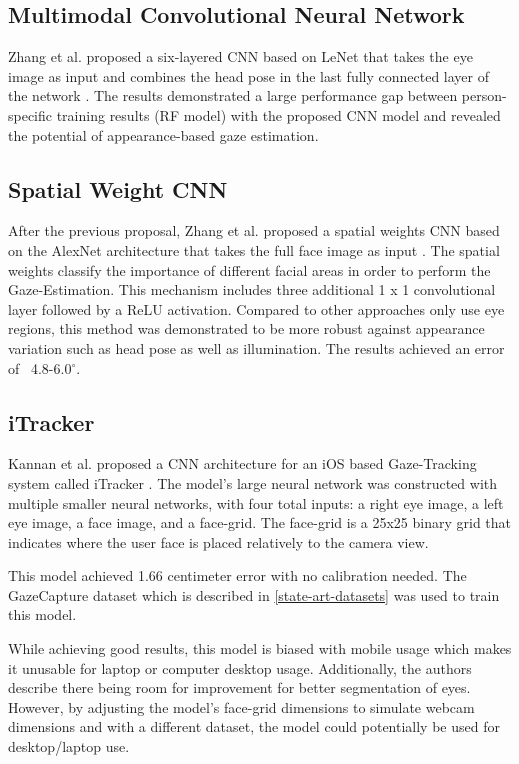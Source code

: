 \subsection{Multimodal Convolutional Neural Network}
Zhang et al. proposed a six-layered CNN based on LeNet that takes the eye image as input and combines the head pose in the last fully connected layer of the network \cite{GazeEstimationInTheWild}. The results demonstrated a large performance gap between person-specific training results (RF model) with the proposed CNN model and revealed the potential of appearance-based gaze estimation.

\subsection{Spatial Weight CNN}
After the previous proposal, Zhang et al. proposed a spatial weights CNN based on the AlexNet architecture \cite{alex_net} that takes the full face image as input \cite{written_all_over_your_face}. The spatial weights classify the importance of different facial areas in order to perform the Gaze-Estimation. This mechanism includes three additional 1 x 1 convolutional layer followed by a ReLU activation. Compared to other approaches only use eye regions, this method was demonstrated to be more robust against appearance variation such as head pose as well as illumination. The results achieved an error of ~4.8-6.0$^{\circ}$.

\subsection{iTracker}
Kannan et al. proposed a CNN architecture for an iOS based Gaze-Tracking system called iTracker \cite{iTracker}. The model's large neural network was constructed with multiple smaller neural networks, with four total inputs: a right eye image, a left eye image, a face image, and a face-grid. The face-grid is a 25x25 binary grid that indicates where the user face is placed relatively to the camera view. 

This model achieved 1.66 centimeter error with no calibration needed. The GazeCapture dataset which is described in \autoref{state-art-datasets} was used to train this model.

While achieving good results, this model is biased with mobile usage which makes it unusable for laptop or computer desktop usage. Additionally, the authors describe there being room for improvement for better segmentation of eyes. However, by adjusting the model's face-grid dimensions to simulate webcam dimensions and with a different dataset, the model could potentially be used for desktop/laptop use.

